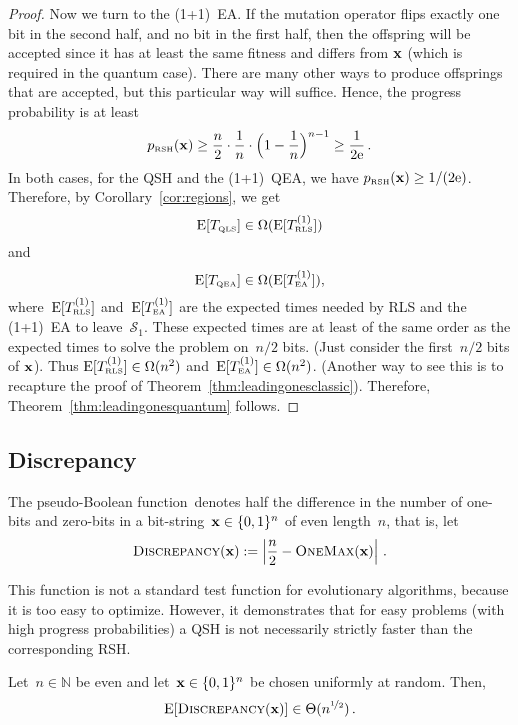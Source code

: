 \documentclass[a4paper,11pt]{article}
\begin{document}
\begin{proof}
Now we turn to the (1+1)~EA. If the mutation operator flips exactly one bit in the second half, and no bit in the first half, then the offspring will be accepted since it has at least the same fitness and differs from $\xvec$ (which is required in the quantum case). There are many other ways to produce offsprings that are accepted, but this particular way will suffice. Hence, the progress probability is at least
 \[
 p_\RSH(\xvec) \ge
 \frac{n}{2}\cdot\frac{1}{n}\cdot\Big(1-\frac{1}{n}\Big)^{n-1}\ge
 \frac{1}{2\euler}\,.
 \]
 In both cases, for the QSH and the (1+1)~QEA, we have $p_\RSH(\xvec) \geq 1/(2\euler)$. Therefore, by Corollary~\ref{cor:regions}, we get
\[
\operatorname{E}[T_{\text{\tiny\rm QLS}}]\in\Omega(\operatorname{E}[T^{(1)}_{\text{\tiny\rm RLS}}])
\]
and
\[
\operatorname{E}[T_{\text{\tiny\rm QEA}}]\in\Omega(\operatorname{E}[T^{(1)}_{\text{\tiny\rm EA}}]),
\]
where~$\operatorname{E}[T^{(1)}_{\text{\tiny\rm RLS}}]$ and~$\operatorname{E}[T^{(1)}_{\text{\tiny\rm EA}}]$ are the expected times needed by RLS and the (1+1)~EA to leave~$\mathcal{S}_1$. These expected times are at least of the same order as the expected times to solve the \leadingones problem on~$n/2$ bits. (Just consider the first~$n/2$ bits of $\xvec$). Thus $\operatorname{E}[T^{(1)}_{\text{\tiny\rm RLS}}]\in\Omega(n^2)$ and~$\operatorname{E}[T^{(1)}_{\text{\tiny\rm EA}}]\in\Omega(n^2)$. (Another way to see this is to recapture the proof of Theorem~\ref{thm:leadingonesclassic}). Therefore, Theorem~\ref{thm:leadingonesquantum} follows.
\end{proof}


\subsection{Discrepancy}
\label{subsec:discrepancy}
The pseudo-Boolean function~\discrepancy denotes half the difference in the number of one-bits and zero-bits in a bit-string~$\xvec\in\{0,1\}^n$ of even length~$n$, that is, let \begin{equation}
\discrepancy(\xvec):=\left|\frac{n}{2}-\onemax(\xvec)\right|\,.
\end{equation}

This function is not a standard test function for evolutionary algorithms, because it is too easy to optimize. However, it demonstrates that for easy problems (with high progress probabilities) a QSH is not necessarily strictly faster than the corresponding RSH.

\begin{lemma}\label{lem:discrepancyofX0}
Let~$n\in\mathbb{N}$ be even and let~$\xvec\in\{0,1\}^n$ be chosen uniformly at random. Then,
\[
\EXP[\discrepancy(\xvec)]\in\Theta(n^{\nicefrac{1}{2}})\,.
\]
\end{lemma}
\end{document}
